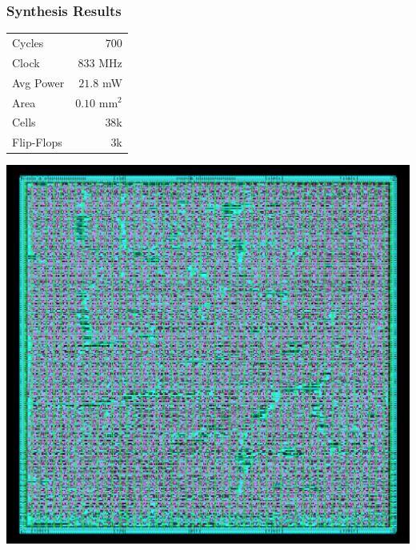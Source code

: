 \documentclass{beamer}
\begin{document}
\begin{frame}
  \frametitle{Synthesis Results}

  \begin{center}
    \begin{vwcol}[widths={0.4,0.5}, rule=0pt]
      \begin{tabular}{lr}
        Cycles & $700$ \\
        Clock & $833$ MHz \\
        Avg Power & $21.8$ mW \\
        Area & $0.10$ $\mathrm{mm}^2$ \\
        Cells & 38k \\
        Flip-Flops & 3k \\
      \end{tabular}

      \includegraphics[width=0.5\linewidth]{mod_invert.png}
    \end{vwcol}
  \end{center}
\end{frame}
\end{document}
